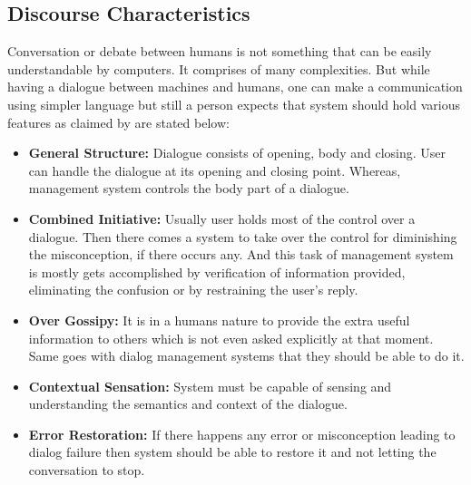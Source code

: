 \subsection{Discourse Characteristics}
Conversation or debate between humans is not something that can be easily understandable by computers. It comprises of many complexities. But while having a dialogue between machines and humans, one can make a communication using simpler language but still a person expects that system should hold various features as claimed by \cite{dialoguemanagementsystems} are stated below: 
\begin{itemize}
\item \textbf{General Structure:} Dialogue consists of opening, body and closing. User can handle the dialogue at its opening and closing point. Whereas, management system controls the body part of a dialogue.
\item \textbf{Combined Initiative:} Usually user holds most of the control over a dialogue. Then there comes a system to take over the control for diminishing the misconception, if there occurs any. And this task of management system is mostly gets accomplished by verification of information provided, eliminating the confusion or by restraining the user's reply. 
\item \textbf{Over Gossipy:} It is in a humans nature to provide the extra useful information to others which is not even asked explicitly at that moment. Same goes with dialog management systems that they should be able to do it.
\item \textbf{Contextual Sensation:} System must be capable of sensing and understanding the semantics and context of the dialogue.
\item \textbf{Error Restoration:} If there happens any error or misconception leading to dialog failure then system should be able to restore it and not letting the conversation to stop. 
\end{itemize}

